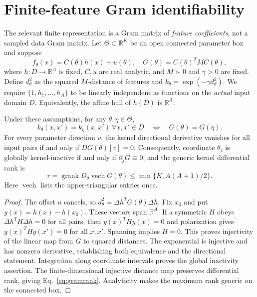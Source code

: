 \section{Finite-feature Gram identifiability}
\label{sec:gram}
The relevant finite representation is a Gram matrix of \emph{feature
coefficients}, not a sampled data Gram matrix. Let $\Theta\subset\mathbb R^K$
be an open connected parameter box and suppose
\begin{equation}
 f_\theta(x)=C(\theta)h(x)+u(\theta),\quad
 G(\theta)=C(\theta)^T M C(\theta),\label{eq:coefficientgram}
\end{equation}
where $h:D\to\mathbb R^A$ is fixed, $C,u$ are real analytic, and
$M\succ0$ and $\gamma>0$ are fixed. Define $d_\theta^2$ as the
squared $M$-distance of features and $k_\theta=\exp(-\gamma d_\theta^2)$.
We require $\{1,h_1,\ldots,h_A\}$ to be linearly independent as
functions on the \emph{actual} input domain $D$. Equivalently, the
affine hull of $h(D)$ is $\mathbb R^A$.

\begin{theorem}\label{thm:gram}
Under these assumptions, for any $\theta,\eta\in\Theta$,
\begin{equation}
 k_\theta(x,x')=k_\eta(x,x')\ \forall x,x'\in D
 \quad\Longleftrightarrow\quad G(\theta)=G(\eta).
\end{equation}
For every parameter direction $v$, the kernel directional derivative
vanishes for all input pairs if and only if $D G(\theta)[v]=0$.
Consequently, coordinate $\theta_j$ is globally kernel-inactive if
and only if $\partial_jG\equiv0$, and the generic kernel differential
rank is
\begin{equation}
 r=\operatorname{grank}D_\theta\operatorname{vech}G(\theta)
 \le \min\{K,A(A+1)/2\}.\label{eq:gramrank}
\end{equation}
Here $\operatorname{vech}$ lists the upper-triangular entries once.
\end{theorem}
\begin{proof}
The offset $u$ cancels, so $d_\theta^2=\Delta h^T G(\theta)\Delta h$.
Fix $x_0$ and put $y(x)=h(x)-h(x_0)$. These vectors span $\mathbb R^A$.
If a symmetric $H$ obeys $\Delta h^TH\Delta h=0$ for all pairs, then
$y(x)^THy(x)=0$ and polarization gives $y(x)^THy(x')=0$ for all
$x,x'$. Spanning implies $H=0$. This proves injectivity of the linear
map from $G$ to squared distances. The exponential is injective and
has nonzero derivative, establishing both equivalence and the
directional statement. Integration along coordinate intervals proves
the global inactivity assertion. The finite-dimensional injective
distance map preserves differential rank, giving Eq.~\eqref{eq:gramrank}.
Analyticity makes the maximum rank generic on the connected box.
\end{proof}

